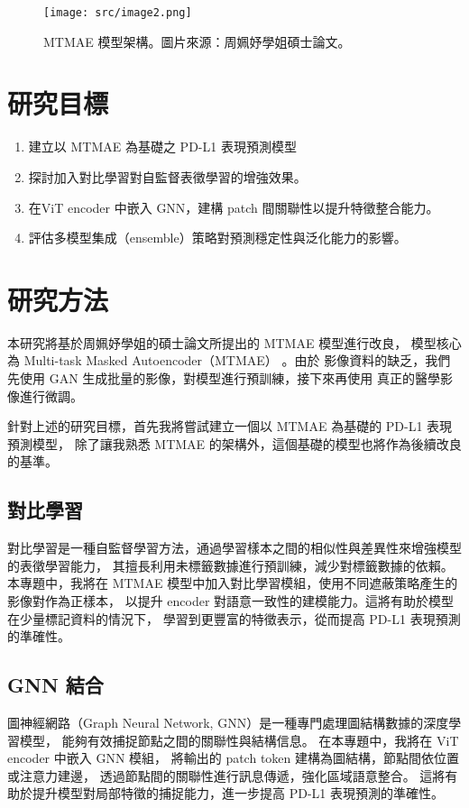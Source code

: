 \documentclass[12pt,a4paper]{article}
\begin{document}
\begin{figure}[H]
  \centering
  \texttt{[image: src/image2.png]}
  \centering
  \caption{MTMAE 模型架構。圖片來源：周姵妤學姐碩士論文。}
  \label{fig:MTMAE-model}
\end{figure}


\section{研究目標}
\begin{enumerate}
  \item 建立以 MTMAE 為基礎之 PD-L1 表現預測模型
  \item 探討加入對比學習對自監督表徵學習的增強效果。
  \item 在ViT encoder 中嵌入 GNN，建構 patch 間關聯性以提升特徵整合能力。
  \item 評估多模型集成（ensemble）策略對預測穩定性與泛化能力的影響。
\end{enumerate}

\newpage

\section{研究方法}
本研究將基於周姵妤學姐的碩士論文所提出的 MTMAE 模型進行改良，
模型核心為 Multi-task Masked Autoencoder（MTMAE） 。由於
影像資料的缺乏，我們先使用 GAΝ 生成批量的影像，對模型進行預訓練，接下來再使用
真正的醫學影像進行微調。

針對上述的研究目標，首先我將嘗試建立一個以 MTMAE 為基礎的 PD-L1 表現預測模型，
除了讓我熟悉 MTMAE 的架構外，這個基礎的模型也將作為後續改良的基準。

\subsection{對比學習}
對比學習是一種自監督學習方法，通過學習樣本之間的相似性與差異性來增強模型的表徵學習能力，
其擅長利用未標籤數據進行預訓練，減少對標籤數據的依賴。
本專題中，我將在 MTMAE 模型中加入對比學習模組，使用不同遮蔽策略產生的影像對作為正樣本，
以提升 encoder 對語意一致性的建模能力。這將有助於模型在少量標記資料的情況下，
學習到更豐富的特徵表示，從而提高 PD-L1 表現預測的準確性。

\subsection{GNN 結合}
圖神經網路（Graph Neural Network, GNN）是一種專門處理圖結構數據的深度學習模型，
能夠有效捕捉節點之間的關聯性與結構信息。
在本專題中，我將在 ViT encoder 中嵌入 GNN 模組，
將輸出的 patch token 建構為圖結構，節點間依位置或注意力建邊，
透過節點間的關聯性進行訊息傳遞，強化區域語意整合。
這將有助於提升模型對局部特徵的捕捉能力，進一步提高 PD-L1 表現預測的準確性。
\end{document}
